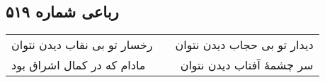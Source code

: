 \begin{center}
\section*{رباعی شماره ۵۱۹}
\label{sec:sh519}
\begin{longtable}{l p{0.5cm} r}
رخسار تو بی نقاب دیدن نتوان
&&
دیدار تو بی حجاب دیدن نتوان
\\
مادام که در کمال اشراق بود
&&
سر چشمهٔ آفتاب دیدن نتوان
\\
\end{longtable}
\end{center}
